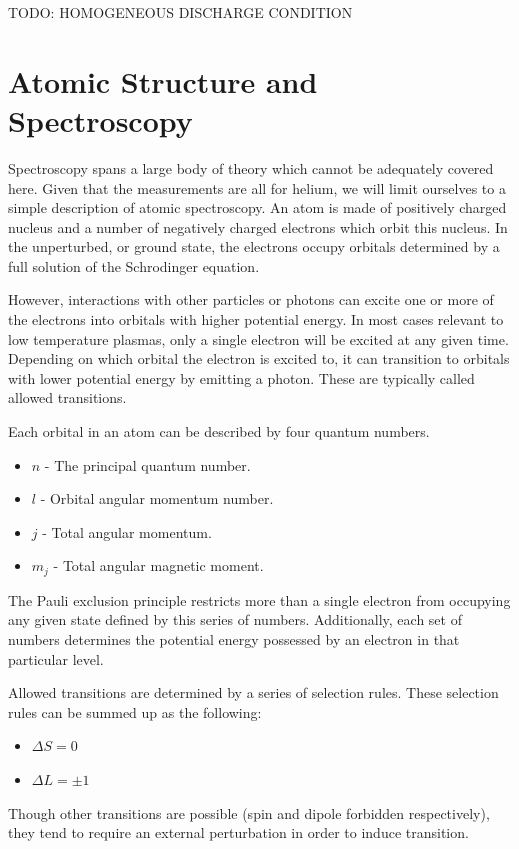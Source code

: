 TODO: HOMOGENEOUS DISCHARGE CONDITION

\section{Atomic Structure and Spectroscopy}

Spectroscopy spans a large body of theory which cannot be adequately
covered here. Given that the measurements are all for helium, we will
limit ourselves to a simple description of atomic spectroscopy. An atom
is made of positively charged nucleus and a number of negatively charged
electrons which orbit this nucleus. In the unperturbed, or ground state,
the electrons occupy orbitals determined by a full solution of the
Schrodinger equation.

However, interactions with other particles or photons can excite one or
more of the electrons into orbitals with higher potential energy. In
most cases relevant to low temperature plasmas, only a single electron
will be excited at any given time. Depending on which orbital the
electron is excited to, it can transition to orbitals with lower
potential energy by emitting a photon. These are typically called
allowed transitions.

Each orbital in an atom can be described by four quantum numbers.
\begin{itemize}
  \item $n$ - The principal quantum number.
  \item $l$ - Orbital angular momentum number.
  \item $j$ - Total angular momentum.
  \item $m_j$ - Total angular magnetic moment.
\end{itemize}
The Pauli exclusion principle restricts more than a single electron from
occupying any given state defined by this series of numbers.
Additionally, each set of numbers determines the potential energy
possessed by an electron in that particular level. 

Allowed transitions are determined by a series of selection rules. These
selection rules can be summed up as the following:
\begin{itemize}
    \item $\Delta S = 0$
    \item $\Delta L = \pm1$
\end{itemize}
Though other transitions are possible (spin and dipole forbidden respectively),
they tend to require an external perturbation in order to induce transition.

